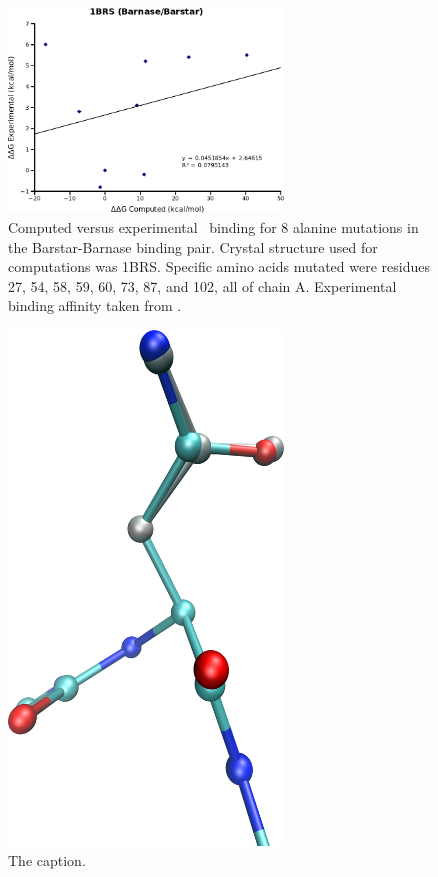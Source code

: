 \begin{figure}[h]
  \centering
  \includegraphics[width=0.65\textwidth]{figures/1brs_barnase_barstar.png}
  \caption{
Computed versus experimental \ddg\ binding for 8 alanine mutations in the Barstar-Barnase binding pair.
Crystal structure used for computations was 1BRS.
Specific amino acids mutated were residues 27, 54, 58, 59, 60, 73, 87, and 102, all of chain A.
Experimental binding affinity taken from \protect\cite{thorn2001asedb}.
            }
\end{figure}

\begin{figure}[h]
  \centering
  \includegraphics[width=0.65\textwidth,height=0.3\textheight,keepaspectratio]{figures/mutation_side_chain_images/1brs_chain_a_resid_58.png}
  \caption{The caption.}
  \label{figure:computational_mutation_scanning/figname}
\end{figure}

